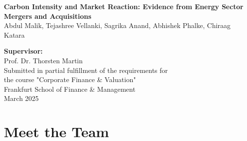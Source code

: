 \begin{titlepage}
    \begin{center}
        \vspace*{2cm} %

        {\Huge \textbf{Carbon Intensity and Market Reaction: Evidence from Energy Sector Mergers and Acquisitions}}\\
        \vspace{2cm}
        {\LARGE Abdul Malik, Tejashree Vellanki, Sagrika Anand, Abhishek Phalke, Chiraag Katara}\\
        \vspace{1.5cm}
      
        \vfill

        \LARGE\textbf{Supervisor:}\\ Prof. Dr. Thorsten Martin\\
        \vspace{1cm}
        Submitted in partial fulfillment of the requirements for \\the course "Corporate Finance \& Valuation"\\
        \vspace{1cm}
        Frankfurt School of Finance \& Management\\
        March 2025
    \end{center}
\end{titlepage}

\section*{Meet the Team}

